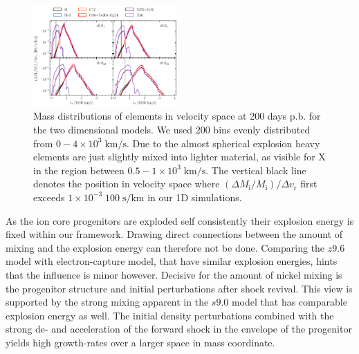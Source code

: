 \documentclass[fleqn,usenatbib]{mnras}
\newcommand{\tracer}{$\mathrm{X}$\xspace}
\begin{document}
\begin{figure}
 \label{fig:e8_massDis_32d}
 \centering
 \includegraphics[width=0.49\textwidth]{pic/massDis_mvr_all_time_200d.pdf}
 \caption{Mass distributions of elements in velocity space at 200 days p.b. for the two dimensional models. We used 200 bins evenly distributed from  $0-4\times 10^3\;\mathrm{km/s}$. Due to the almost spherical explosion heavy elements are just slightly mixed into lighter material, as visible for \tracer in the region between $0.5-1\times 10^3\;\mathrm{km/s}$. The vertical black line denotes the position in velocity space where $(\Delta M_{\mathrm{i}}/M_{\mathrm{i}})/\Delta v_{\mathrm{r}}$ first exceeds $1\times 10^{-3}\;\mathrm{100\;s/km}$ in our 1D simulations.}
\end{figure}
As the ion core progenitors are exploded self consistently their explosion energy is fixed within our framework. Drawing direct connections between the amount of mixing and the explosion energy can therefore not be done. Comparing the $z9.6$ model with electron-capture model, that have similar explosion energies, hints that the influence is minor however. Decisive for the amount of nickel mixing is the progenitor structure and initial perturbations after shock revival. This view is supported by the strong mixing apparent in the $s9.0$ model that has comparable explosion energy as well. The initial density perturbations combined with the strong de- and acceleration of the forward shock in the envelope of the progenitor yields high growth-rates over a larger space in mass coordinate. 
\end{document}
